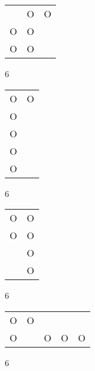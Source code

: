 \begin{tabular}{|m{0.2cm}m{0.2cm}m{0.2cm}|}\hline
 &O&O\\
O&O& \\
O&O& \\
\hline\end{tabular}6
\begin{tabular}{|m{0.2cm}m{0.2cm}|}\hline
O&O\\
O& \\
O& \\
O& \\
O& \\
\hline\end{tabular}6
\begin{tabular}{|m{0.2cm}m{0.2cm}|}\hline
O&O\\
O&O\\
 &O\\
 &O\\
\hline\end{tabular}6
\begin{tabular}{|m{0.2cm}m{0.2cm}m{0.2cm}m{0.2cm}m{0.2cm}|}\hline
O&O& & & \\
O& &O&O&O\\
\hline\end{tabular}6
